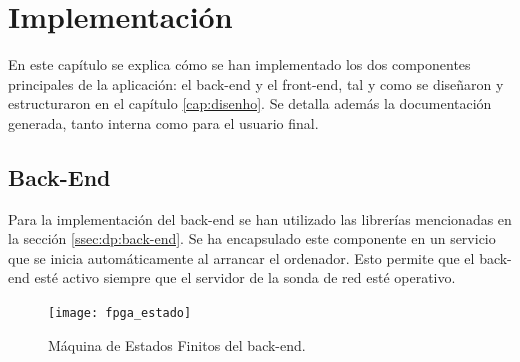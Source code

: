\chapter{Implementación\label{cap:implementacion}}

En este capítulo se explica cómo se han implementado los dos componentes principales de la aplicación: el \gls{back-end} y el \gls{front-end}, tal y como se diseñaron y estructuraron en el capítulo \ref{cap:disenho}.
Se detalla además la documentación generada, tanto interna como para el usuario final.

\section{Back-End\label{sec:imp:back_end}}

Para la implementación del \gls{back-end} se han utilizado las librerías mencionadas en la sección \ref{ssec:dp:back-end}.
Se ha encapsulado este componente en un servicio que se inicia automáticamente al arrancar el ordenador.
Esto permite que el \gls{back-end} esté activo siempre que el servidor de la sonda de red esté operativo.

\begin{figure}[!htp]
  \centering
  \texttt{[image: fpga\_estado]}
  \caption{Máquina de Estados Finitos del \gls{back-end}.}
  \label{fig:fpga_estado}
\end{figure}

